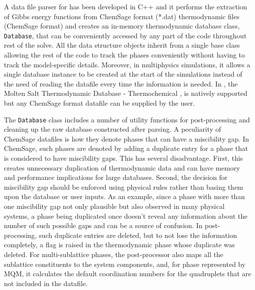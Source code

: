 	A data file parser for {\GEM} has been developed in C++ and it performs the extraction of Gibbs energy functions from ChemSage format (*.dat) thermodynamic files (ChemSage format) and creates an in-memory thermodynamic database class, \texttt{Database}, that can be conveniently accessed by any part of the code throughout rest of the solve. All the data structure objects inherit from a single base class allowing the rest of the code to track the phases conveniently without having to track the model-specific  details. Moreover, in multiphysics simulations, it allows a single database instance to be created at the start of the simulations instead of the need of reading the datafile every time the information is needed. In {\GEM}, the Molten Salt Thermodynamic Database - Thermochemical \cite{MSTDB}, is natively supported but any ChemSage format datafile can be supplied by the user.
	
	The \texttt{Database} class includes a number of utility functions for post-processing and cleaning up the raw database constructed after parsing. A peculiarity of ChemSage datafiles is how they denote phases that can have a miscibility gap. In ChemSage, such phases are denoted by adding a duplicate entry for a phase that is considered to have miscibility gaps. This has several disadvantage. First, this creates unnecessary duplication of thermodynamic data and can have memory and performance implications for large databases. Second, the decision for miscibility gap should be enforced using physical rules rather than basing them upon the database or user inputs. As an example, since a phase with more than one miscibility gap not only plausible but also observed in many physical systems, a phase being duplicated once doesn't reveal any information about the number of such possible gaps and can be a source of confusion. In post-processing, such duplicate entries are deleted, but to not lose the information completely, a flag is raised in the thermodynamic phase whose duplicate was deleted. For multi-sublattice phases, the post-processor also maps all the sublattice constituents to the system components, and, for phase represented by MQM, it calculates the default coordination numbers for the quadruplets that are not included in the datafile.
	
